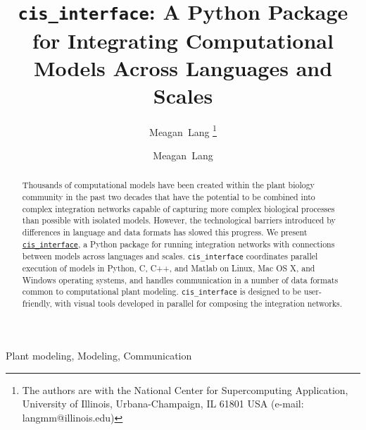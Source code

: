 \documentclass[journal]{IEEEtran}
\newcommand{\cis}{{\tt cis\_interface}{}}
\begin{document}
\ifieee
\else
	\shorttitle{{\cis}}
\fi

\title{{\cis}: A Python Package for Integrating Computational Models Across Languages and Scales}

\ifieee
	\author{Meagan~Lang%
	\thanks{The authors are with the National Center for Supercomputing Application, University of Illinois, Urbana-Champaign, IL 61801 USA (e-mail: langmm@illinois.edu)}}
\else
	\author{Meagan~Lang}

\fi


\ifieee
	\maketitle
\fi

\begin{abstract}
Thousands of computational models have been created within the plant biology community in the past two decades that have the potential to be combined into complex integration networks capable of capturing more complex biological processes than possible with isolated models. However, the technological barriers introduced by differences in language and data formats has slowed this progress. We present \href{https://github.com/cropsinsilico/cis_interface}{\cis}, a Python package for running integration networks with connections between models across languages and scales. {\cis} coordinates parallel execution of models in Python, C, C++, and Matlab on Linux, Mac OS X, and Windows operating systems, and handles communication in a number of data formats common to computational plant modeling. {\cis} is designed to be user-friendly, with visual tools developed in parallel for composing the integration networks. 
\end{abstract}

\ifieee
	\begin{IEEEkeywords}
		Plant modeling, Modeling, Communication
	\end{IEEEkeywords}
	\IEEEpeerreviewmaketitle
\else
	\maketitle
\fi

\end{document}
